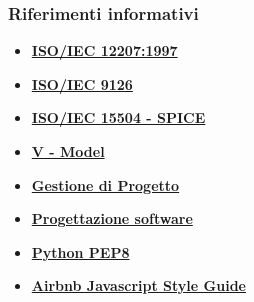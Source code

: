 \subsubsection{Riferimenti informativi}
\begin{itemize}
	\item 
	\href{https://www.math.unipd.it/~tullio/IS-1/2009/Approfondimenti/ISO_12207-1995.pdf}{\textbf{ISO/IEC 12207:1997}}
	\item 
	\href{https://it.wikipedia.org/wiki/ISO/IEC_9126}{\textbf{ISO/IEC 9126}}
	\item
	\href{https://en.wikipedia.org/wiki/ISO/IEC_15504}{\textbf{ISO/IEC 15504 - SPICE}}\
	\item
	\href{https://it.wikipedia.org/wiki/V-Model}{\textbf{V - Model}}
	\item
	\href {https://www.math.unipd.it/~tullio/IS-1/2021/Dispense/T06.pdf}{\textbf{Gestione di Progetto}}
	\item
	\href{https://www.math.unipd.it/~tullio/IS-1/2021/Dispense/T09.pdf}{\textbf{Progettazione software}}
	\item 
	\href{https://peps.python.org/pep-0008/}{\textbf{Python PEP8}}
	\item 
	\href{https://github.com/airbnb/javascript}{\textbf{Airbnb Javascript Style Guide}}
\end{itemize}
